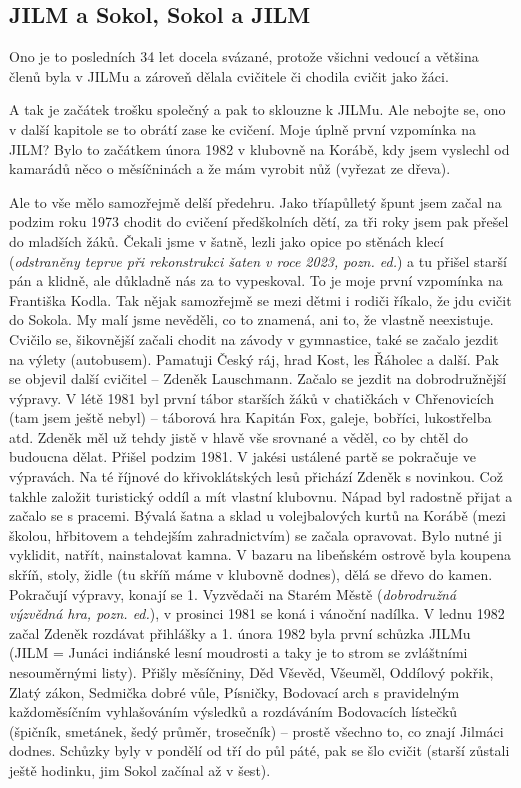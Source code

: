 \subsection{JILM a Sokol, Sokol a JILM}\label{jilm-a-sokol-sokol-a-jilm}

Ono je to posledních 34 let docela svázané, protože všichni vedoucí a
většina členů byla v JILMu a zároveň dělala cvičitele či chodila cvičit
jako žáci.

A tak je začátek trošku společný a pak to sklouzne k JILMu. Ale nebojte
se, ono v další kapitole se to obrátí zase ke cvičení. Moje úplně první
vzpomínka na JILM? Bylo to začátkem února 1982 v klubovně na Korábě, kdy
jsem vyslechl od kamarádů něco o měsíčninách a že mám vyrobit nůž
(vyřezat ze dřeva).

Ale to vše mělo samozřejmě delší předehru. Jako tříapůlletý špunt jsem
začal na podzim roku 1973 chodit do cvičení předškolních dětí, za tři
roky jsem pak přešel do mladších žáků. Čekali jsme v šatně, lezli jako
opice po stěnách klecí (\emph{odstraněny teprve při rekonstrukci šaten v
roce 2023, pozn. ed.}) a tu přišel starší pán a klidně, ale důkladně nás
za to vypeskoval. To je moje první vzpomínka na Františka Kodla. Tak
nějak samozřejmě se mezi dětmi i rodiči říkalo, že jdu cvičit do Sokola.
My malí jsme nevěděli, co to znamená, ani to, že vlastně neexistuje.
Cvičilo se, šikovnější začali chodit na závody v gymnastice, také se
začalo jezdit na výlety (autobusem). Pamatuji Český ráj, hrad Kost, les
Řáholec a další. Pak se objevil další cvičitel -- Zdeněk Lauschmann.
Začalo se jezdit na dobrodružnější výpravy. V létě 1981 byl první tábor
starších žáků v chatičkách v Chřenovicích (tam jsem ještě nebyl) --
táborová hra Kapitán Fox, galeje, bobříci, lukostřelba atd. Zdeněk měl
už tehdy jistě v hlavě vše srovnané a věděl, co by chtěl do budoucna
dělat. Přišel podzim 1981. V jakési ustálené partě se pokračuje ve
výpravách. Na té říjnové do křivoklátských lesů přichází Zdeněk s
novinkou. Což takhle založit turistický oddíl a mít vlastní klubovnu.
Nápad byl radostně přijat a začalo se s pracemi. Bývalá šatna a sklad u
volejbalových kurtů na Korábě (mezi školou, hřbitovem a tehdejším
zahradnictvím) se začala opravovat. Bylo nutné ji vyklidit, natřít,
nainstalovat kamna. V bazaru na libeňském ostrově byla koupena skříň,
stoly, židle (tu skříň máme v klubovně dodnes), dělá se dřevo do kamen.
Pokračují výpravy, konají se 1. Vyzvědači na Starém Městě
(\emph{dobrodružná výzvědná hra, pozn. ed.}), v prosinci 1981 se koná i
vánoční nadílka. V lednu 1982 začal Zdeněk rozdávat přihlášky a 1. února
1982 byla první schůzka JILMu (JILM = Junáci indiánské lesní moudrosti a
taky je to strom se zvláštními nesouměrnými listy). Přišly měsíčniny,
Děd Vševěd, Všeuměl, Oddílový pokřik, Zlatý zákon, Sedmička dobré vůle,
Písničky, Bodovací arch s pravidelným každoměsíčním vyhlašováním
výsledků a rozdáváním Bodovacích lístečků (špičník, smetánek, šedý
průměr, trosečník) -- prostě všechno to, co znají Jilmáci dodnes.
Schůzky byly v pondělí od tří do půl páté, pak se šlo cvičit (starší
zůstali ještě hodinku, jim Sokol začínal až v šest).

